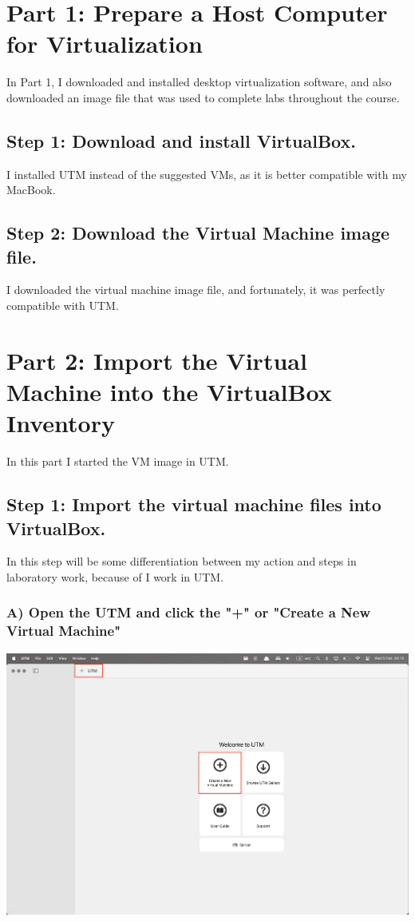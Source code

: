 \documentclass{article}
\begin{document}
\newpage

\section*{Part 1: Prepare a Host Computer for Virtualization}

In Part 1, I downloaded and installed desktop virtualization software, and also downloaded an image file that
was used to complete labs throughout the course.

\subsection*{Step 1: Download and install VirtualBox.}
I installed UTM instead of the suggested VMs, as it is better compatible with my MacBook.

\subsection*{Step 2: Download the Virtual Machine image file.}
I downloaded the virtual machine image file, and fortunately, it was perfectly compatible with UTM.

\section*{Part 2: Import the Virtual Machine into the VirtualBox Inventory}

In this part I started the VM image in UTM.

\subsection*{Step 1: Import the virtual machine files into VirtualBox.}

In this step will be some differentiation between my action and steps in laboratory work, because of I work in UTM.

\subsubsection*{A) Open the UTM and click the "+" or "Create a New Virtual Machine"}
\includegraphics[width=1\textwidth]{Part2/Step1/1.png}
\end{document}
